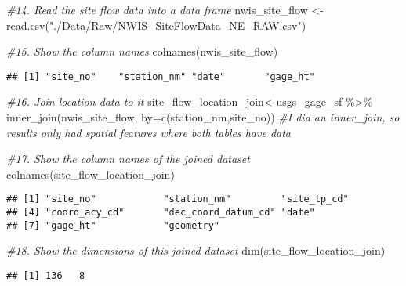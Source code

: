 \documentclass[
]{article}
\newenvironment{Shaded}{\begin{snugshade}}{\end{snugshade}}
\newcommand{\AttributeTok}[1]{\textcolor[rgb]{0.77,0.63,0.00}{#1}}
\newcommand{\CommentTok}[1]{\textcolor[rgb]{0.56,0.35,0.01}{\textit{#1}}}
\newcommand{\FunctionTok}[1]{\textcolor[rgb]{0.00,0.00,0.00}{#1}}
\newcommand{\NormalTok}[1]{#1}
\newcommand{\OtherTok}[1]{\textcolor[rgb]{0.56,0.35,0.01}{#1}}
\newcommand{\SpecialCharTok}[1]{\textcolor[rgb]{0.00,0.00,0.00}{#1}}
\newcommand{\StringTok}[1]{\textcolor[rgb]{0.31,0.60,0.02}{#1}}
\begin{document}
\begin{Shaded}
\begin{Highlighting}[]
\CommentTok{\#14. Read the site flow data into a data frame}
\NormalTok{nwis\_site\_flow }\OtherTok{\textless{}{-}}\FunctionTok{read.csv}\NormalTok{(}\StringTok{"./Data/Raw/NWIS\_SiteFlowData\_NE\_RAW.csv"}\NormalTok{)}

\CommentTok{\#15. Show the column names}
\FunctionTok{colnames}\NormalTok{(nwis\_site\_flow)}
\end{Highlighting}
\end{Shaded}

\begin{verbatim}
## [1] "site_no"    "station_nm" "date"       "gage_ht"
\end{verbatim}

\begin{Shaded}
\begin{Highlighting}[]
\CommentTok{\#16. Join location data to it}
\NormalTok{site\_flow\_location\_join}\OtherTok{\textless{}{-}}\NormalTok{usgs\_gage\_sf }\SpecialCharTok{\%\textgreater{}\%}
              \FunctionTok{inner\_join}\NormalTok{(nwis\_site\_flow, }\AttributeTok{by=}\FunctionTok{c}\NormalTok{(}\StringTok{\textquotesingle{}station\_nm\textquotesingle{}}\NormalTok{,}\StringTok{\textquotesingle{}site\_no\textquotesingle{}}\NormalTok{))}
\CommentTok{\#I did an inner\_join, so results only had spatial features where both tables have data}

\CommentTok{\#17. Show the column names of the joined dataset}
\FunctionTok{colnames}\NormalTok{(site\_flow\_location\_join)}
\end{Highlighting}
\end{Shaded}

\begin{verbatim}
## [1] "site_no"            "station_nm"         "site_tp_cd"        
## [4] "coord_acy_cd"       "dec_coord_datum_cd" "date"              
## [7] "gage_ht"            "geometry"
\end{verbatim}

\begin{Shaded}
\begin{Highlighting}[]
\CommentTok{\#18. Show the dimensions of this joined dataset}
\FunctionTok{dim}\NormalTok{(site\_flow\_location\_join)}
\end{Highlighting}
\end{Shaded}

\begin{verbatim}
## [1] 136   8
\end{verbatim}
\end{document}
